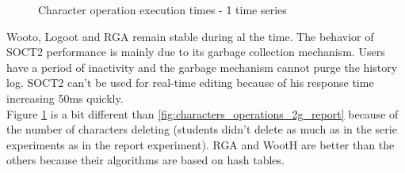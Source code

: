 \begin{figure}[h!]
\begin{minipage}{.50\linewidth}
  \caption{Character operation execution times - 1 time
series}
  \label{fig:characters_operations_1t_big}
\end{minipage} \hfill
\end{figure}

Wooto, Logoot and RGA remain stable during al the time. The behavior of SOCT2 performance is mainly due to its garbage collection mechanism. Users have a period of inactivity and the garbage mechanism cannot purge the history log. SOCT2 can't be used for real-time editing because of his response time increasing 50ms quickly.\\

Figure \ref{fig:characters_operations_1t_big} is a bit different than \ref{fig:characters_operations_2g_report} because of the number of characters deleting (students didn't delete as much as in the serie experiments as in the report experiment). RGA and WootH are better than the others because their algorithms are based on hash tables.\\

